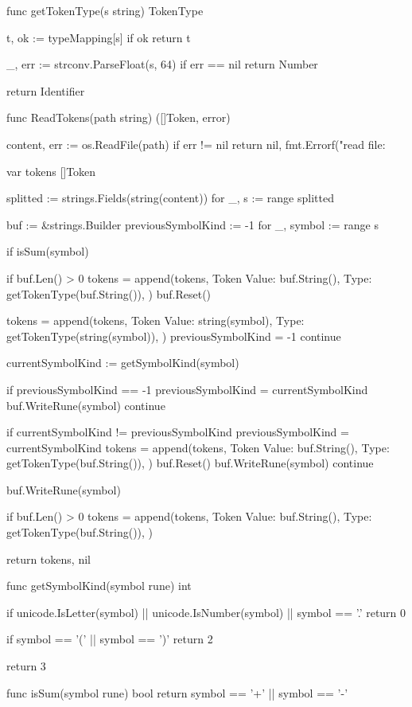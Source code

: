 func getTokenType(s string) TokenType {
	t, ok := typeMapping[s]
	if ok {
		return t
	}

	_, err := strconv.ParseFloat(s, 64)
	if err == nil {
		return Number
	}

	return Identifier
}

func ReadTokens(path string) ([]Token, error) {
	content, err := os.ReadFile(path)
	if err != nil {
		return nil, fmt.Errorf("read file: %
	}

	var tokens []Token

	splitted := strings.Fields(string(content))
	for _, s := range splitted {
		buf := &strings.Builder{}
		previousSymbolKind := -1
		for _, symbol := range s {
			if isSum(symbol) {
				if buf.Len() > 0 {
					tokens = append(tokens, Token{
						Value: buf.String(),
						Type:  getTokenType(buf.String()),
					})
					buf.Reset()
				}

				tokens = append(tokens, Token{
					Value: string(symbol),
					Type:  getTokenType(string(symbol)),
				})
				previousSymbolKind = -1
				continue
			}

			currentSymbolKind := getSymbolKind(symbol)

			if previousSymbolKind == -1 {
				previousSymbolKind = currentSymbolKind
				buf.WriteRune(symbol)
				continue
			}

			if currentSymbolKind != previousSymbolKind {
				previousSymbolKind = currentSymbolKind
				tokens = append(tokens, Token{
					Value: buf.String(),
					Type:  getTokenType(buf.String()),
				})
				buf.Reset()
				buf.WriteRune(symbol)
				continue
			}

			buf.WriteRune(symbol)
		}

		if buf.Len() > 0 {
			tokens = append(tokens, Token{
				Value: buf.String(),
				Type:  getTokenType(buf.String()),
			})
		}
	}

	return tokens, nil
}

func getSymbolKind(symbol rune) int {
	if unicode.IsLetter(symbol) || unicode.IsNumber(symbol) || symbol == '.' {
		return 0
	}

	if symbol == '(' || symbol == ')' {
		return 2
	}

	return 3
}

func isSum(symbol rune) bool {
	return symbol == '+' || symbol == '-'
}
